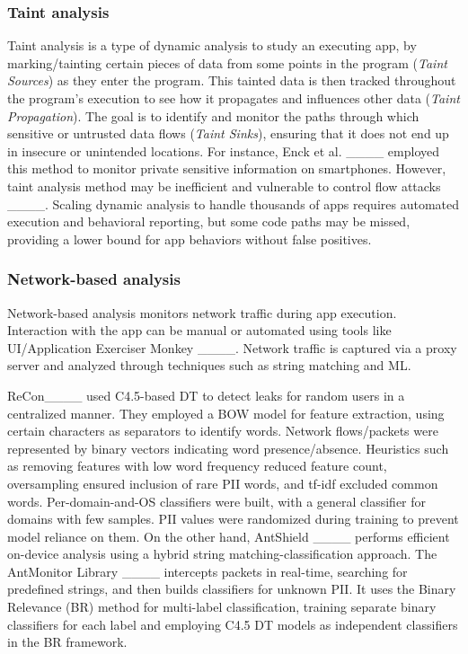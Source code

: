 \subsubsection{Taint analysis}
Taint analysis is a type of dynamic analysis to study an executing app, by marking/tainting certain pieces of data from some points in the program (\textit{Taint Sources}) as they enter the program. This tainted data is then tracked throughout the program's execution to see how it propagates and influences other data (\textit{Taint Propagation}). The goal is to identify and monitor the paths through which sensitive or untrusted data flows (\textit{Taint Sinks}), ensuring that it does not end up in insecure or unintended locations. For instance, Enck et al. ____ employed this method to monitor private sensitive information on smartphones. However, taint analysis method may be inefficient and vulnerable to control flow attacks ____. Scaling dynamic analysis to handle thousands of apps requires automated execution and behavioral reporting, but some code paths may be missed, providing a lower bound for app behaviors without false positives.

\subsubsection{Network-based analysis}
Network-based analysis monitors network traffic during app execution. Interaction with the app can be manual or automated using tools like UI/Application Exerciser Monkey ____. Network traffic is captured via a proxy server and analyzed through techniques such as string matching and ML.

ReCon____ used C4.5-based DT to detect leaks for random users in a centralized manner. They employed a BOW model for feature extraction, using certain characters as separators to identify words. Network flows/packets were represented by binary vectors indicating word presence/absence. Heuristics such as removing features with low word frequency reduced feature count, oversampling ensured inclusion of rare PII words, and tf-idf excluded common words. Per-domain-and-OS classifiers were built, with a general classifier for domains with few samples. PII values were randomized during training to prevent model reliance on them. On the other hand, AntShield ____ performs efficient on-device analysis using a hybrid string matching-classification approach. The AntMonitor Library ____ intercepts packets in real-time, searching for predefined strings, and then builds classifiers for unknown PII. It uses the Binary Relevance (BR) method for multi-label classification, training separate binary classifiers for each label and employing C4.5 DT models as independent classifiers in the BR framework.

